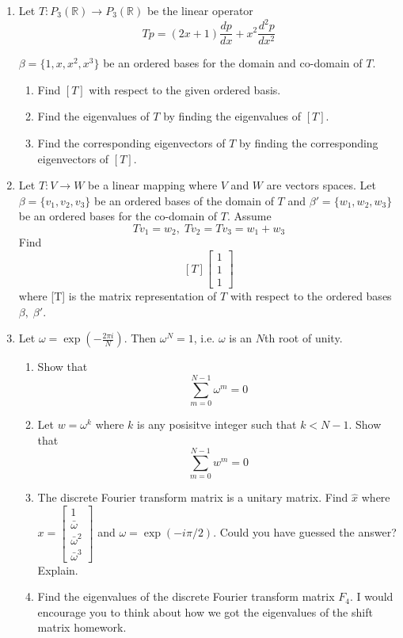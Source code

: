\documentclass[12pt]{article}
\begin{document}
\begin{enumerate}
\item  Let $T: P_{3}(\mathbb{R}) \rightarrow P_{3}(\mathbb{R})$ be the linear operator 
    \[
    Tp = (2x + 1)\frac{dp}{dx} + x^{2} \frac{d^{2}p}{dx^{2}} 
    \]
    
    
    $\beta = \{ 1, x, x^{2}, x^{3} \}$ be an ordered bases for the domain and co-domain of $T$. 
    \begin{enumerate}
        \item Find $[T]$ with respect to the given ordered basis.  
        \item Find the eigenvalues of $T$ by finding the eigenvalues of $[T]$.
        \item Find the corresponding eigenvectors of $T$ by finding the corresponding eigenvectors of $[T]$.  
    \end{enumerate}  

    
    
    \item    Let $T:V \rightarrow W$ be a linear mapping where $V$ and $W$ are vectors spaces.
    Let $\beta = \{v_{1}, v_{2}, v_{3}\}$ be an ordered bases of the domain of $T$ and $\beta' = \{ w_{1}, w_{2}, w_{3} \}$ be an ordered bases for the co-domain of $T$.  Assume 
    \[
    Tv_{1} = w_{2}, \; Tv_{2} = Tv_{3} = w_{1} + w_{3} 
    \]
    Find 
    \[
    [T] \begin{bmatrix} 1 \\ 1 \\ 1 \end{bmatrix} 
    \]
    where [T] is the matrix representation of $T$ with respect to the ordered bases $\beta, \; \beta'$. 







\item Let $\omega = \exp\left( - \frac{2\pi i}{N} \right)$.  Then $\omega^{N} = 1$, i.e. $\omega$ is an $N$th root of unity.  
\begin{enumerate} 
\item Show that 
\[
\sum_{m=0}^{N-1}\omega^{m} = 0
\]
\item Let $w = \omega^{k}$ where $k$ is any posisitve integer such that $k < N -1$.  Show that 
\[
\sum_{m=0}^{N-1} w^{m} = 0
\]
\item The discrete Fourier transform matrix is a unitary matrix.   Find $\hat{x}$ where $x = \begin{bmatrix} 1 \\ \bar{\omega} \\ \bar{\omega}^{2} \\ \bar{\omega}^{3} \end{bmatrix}$ and $\omega = \exp( - i\pi/2)$.  Could you have guessed the answer?  Explain.  
\item Find the eigenvalues of the discrete Fourier transform matrix $F_{4}$.  I would encourage you to think about how we got the eigenvalues of the shift matrix homework.   


\end{enumerate}
\end{enumerate}
\end{document}
